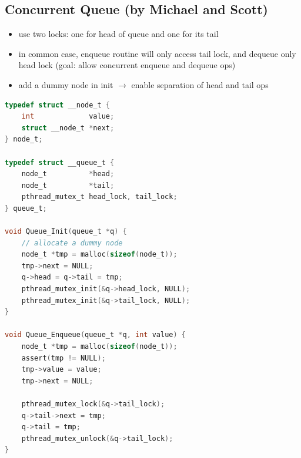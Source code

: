 \documentclass[8pt,a4paper,landscape]{extarticle}
\begin{document}
\begin{multicols*}{3}
\section*{Concurrent Queue (by Michael and Scott)}
\begin{itemize}
\item use two locks: one for head of queue and one for its tail
\item in common case, enqueue routine will only access tail lock, and dequeue only head lock (goal: allow concurrent enqueue and dequeue ops)
\item add a dummy node in init $\to$ enable separation of head and tail ops
\end{itemize}
\begin{lstlisting}[language=c,xleftmargin=16pt,xrightmargin=6pt,framextopmargin=3pt]
typedef struct __node_t {
    int             value;
    struct __node_t *next;
} node_t;

typedef struct __queue_t {
    node_t          *head;
    node_t          *tail;
    pthread_mutex_t head_lock, tail_lock;
} queue_t;

void Queue_Init(queue_t *q) {
    // allocate a dummy node
    node_t *tmp = malloc(sizeof(node_t));
    tmp->next = NULL;
    q->head = q->tail = tmp;
    pthread_mutex_init(&q->head_lock, NULL);
    pthread_mutex_init(&q->tail_lock, NULL);
}

void Queue_Enqueue(queue_t *q, int value) {
    node_t *tmp = malloc(sizeof(node_t));
    assert(tmp != NULL);
    tmp->value = value;
    tmp->next = NULL;

    pthread_mutex_lock(&q->tail_lock);
    q->tail->next = tmp;
    q->tail = tmp;
    pthread_mutex_unlock(&q->tail_lock);
}


\end{lstlisting}
\end{multicols*}
\end{document}
